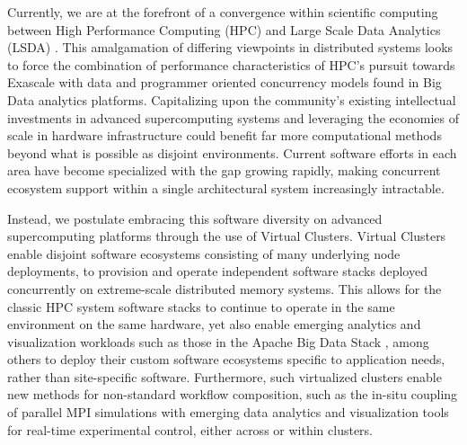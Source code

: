 Currently, we are at the forefront of a convergence within scientific computing between High Performance Computing (HPC) and Large Scale Data Analytics (LSDA) \cite{reed2015exascale, leland2016lsda}. This amalgamation of  differing viewpoints in distributed systems looks to force the combination of performance characteristics of HPC's pursuit towards Exascale with data and programmer oriented concurrency models found in Big Data analytics platforms.  Capitalizing upon the community's existing intellectual investments in advanced supercomputing systems and leveraging the economies of scale in hardware infrastructure could benefit far more computational methods beyond what is possible as disjoint environments.  Current software efforts in each area have become specialized with the gap growing rapidly, making concurrent ecosystem support within a single architectural system increasingly intractable.

Instead, we postulate embracing this software diversity on advanced supercomputing platforms through the use of Virtual Clusters. Virtual Clusters enable disjoint software ecosystems consisting of many underlying node deployments, to provision and operate independent software stacks deployed concurrently on extreme-scale distributed memory systems.  This allows for the classic HPC system software stacks to continue to operate in the same environment on the same hardware, yet also enable emerging analytics and visualization workloads such as those in the Apache Big Data Stack \cite{fox2015hpcabds}, among others to deploy their custom software ecosystems specific to application needs, rather than site-specific software.  Furthermore, such virtualized clusters enable new methods for non-standard workflow composition, such as the in-situ coupling of parallel MPI simulations with emerging data analytics and visualization tools for real-time experimental control, either across or within clusters. 


